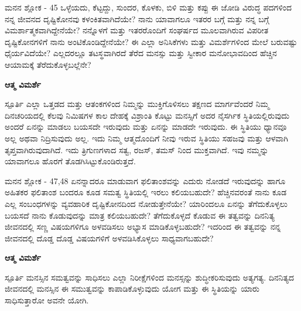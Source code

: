 \begin{mananam}{\mananamfont ಮನನ ಶ್ಲೋಕ - \textenglish{45}}
\footnotesize \mananamtext ಒಳ್ಳೆಯದು, ಕೆಟ್ಟದ್ದು, ಸುಂದರ, ಕೊಳಕು, ಬಿಳಿ ಮತ್ತು ಕಪ್ಪು ಈ ಜೋಡಿ ವಿರುದ್ಧ ಪದಗಳಿಂದ ನನ್ನ ಜೀವನದ ದೃಷ್ಟಿಕೋನವು ಕಳಂಕಿತವಾಗಿದೆಯೇ? ನಾನು ಯಾವಾಗಲೂ ಇತರರ ಬಗ್ಗೆ ಮತ್ತು ನನ್ನ ಬಗ್ಗೆ ವಿಮರ್ಶಾತ್ಮಕವಾಗಿದ್ದೇನೆಯೇ? ನನ್ನೊಳಗೆ ಮತ್ತು ಇತರರೊಂದಿಗೆ ಸಂಘರ್ಷದ ಮೂಲವಾಗಿರುವ ವಿಪರೀತ ದೃಷ್ಟಿಕೋನಗಳಿಗೆ ನಾನು ಅಂಟಿಕೊಂಡಿದ್ದೇನೆಯೇ? ಈ ಎಲ್ಲಾ ಅನಿಸಿಕೆಗಳು ಮತ್ತು ವಿಮರ್ಶೆಗಳಿಂದ ಮೇಲೆ ಬರುವಷ್ಟು ಧೈರ್ಯವಿದೆಯೇ? ಎಲ್ಲದರಲ್ಲೂ ತಟಸ್ಥವಾಗಿರದೆ ತೆರೆದ ಮನಸ್ಸು ಮತ್ತು ಸ್ವೀಕಾರ ಮನೋಭಾವದಿಂದ ಹೆಚ್ಚಿನ ಆಯಾಮಕ್ಕೆ ತೆರೆದುಕೊಳ್ಳಬಲ್ಲೆನೇ?
\end{mananam}
\WritingHand\enspace\textbf{ಆತ್ಮ ವಿಮರ್ಶೆ}
\begin{inspiration}{\mananamfont ಸ್ಪೂರ್ತಿ}
\footnotesize \mananamtext ಎಲ್ಲಾ ಒತ್ತಡದ ಮತ್ತು ಆತಂಕಗಳಿಂದ ನಿಮ್ಮನ್ನು ಮುಕ್ತಿಗೊಳಿಸಲು ತಕ್ಷಣದ ಮಾರ್ಗವೆಂದರೆ ನಿಮ್ಮ ದಿನಚರಿಯದಲ್ಲಿ ಕೆಲವು ನಿಮಿಷಗಳ ಕಾಲ ದೇಹಕ್ಕೆ ವಿಶ್ರಾಂತಿ ಕೊಟ್ಟು ಮನಸ್ಸಿಗೆ ಅದರ ನೈಸರ್ಗಿಕ ಸ್ಥಿತಿಯಲ್ಲಿರುವುದು ಅಂದರೆ ಏನನ್ನು ಮಾಡಲು ಬಯಸದೇ ಇರುವುದು ಮತ್ತು ಏನನ್ನು ಮಾಡದೇ ಇರುವುದು. ಈ ಸ್ಥಿತಿಯು ಧ್ಯಾನವೂ ಅಲ್ಲ ಅಥವಾ ನಿದ್ರಿಸುವುದು ಅಲ್ಲ. ಇದು ನಿಮ್ಮ ಆತ್ಮದೊಂದಿಗೆ ನೀವು ಇರುವ ಸ್ಥಿತಿಯು ಸಹಜವು ಮತ್ತು ಆಳವಾಗಿ ತೃಪ್ತವಾಗಿರುವುದಾಗಿದೆ. ಇದು ತ್ರಿಗುಣಗಳಾದ ಸತ್ವ, ರಜಸ್, ತಮಸ್ ನಿಂದ ಮುಕ್ತವಾಗಿದೆ. ಇವು ನಮ್ಮನ್ನು ಯಾವಾಗಲೂ ಹೊರಗೆ ತೊಡಗಿಸಿಟ್ಟುಕೊಂಡಿರುತ್ತದೆ.
\end{inspiration}
\newpage

\newpage
\begin{mananam}{\mananamfont ಮನನ ಶ್ಲೋಕ - \textenglish{47,48}}
\footnotesize \mananamtext ಏನನ್ನಾದರೂ ಮಾಡುವಾಗ ಫಲಿತಾಂಶವನ್ನು ಎದುರು ನೋಡದೆ ಇರುವುದನ್ನು ಹಾಗೂ ಅಹಿತಕರ ಫಲಿತಾಂಶ ಬಂದರೂ ಕೂಡ ಸಮತ್ವ ಸ್ಥಿತಿಯಲ್ಲಿ ಇರಲು ಕಲಿಯಬಹುದೇ? ಹೆಚ್ಚಿನವರಂತೆ ನಾನು ಕೂಡ ಎಲ್ಲ ಸಂಬಂಧಗಳನ್ನು ವ್ಯವಹಾರಿಕ ದೃಷ್ಟಿಕೋನದಿಂದ ನೋಡುತ್ತೇನೆಯೇ? ಯಾರಿಂದಲೂ ಏನನ್ನು ತೆಗೆದುಕೊಳ್ಳಲು ಬಯಸದೆ ನಾನು ಕೊಡುವುದನ್ನು ಮಾತ್ರ ಕಲಿಯಬಹುದೇ? ತೆಗೆದುಕೊಳ್ಳದೆ ಕೊಡುವ ಈ ತತ್ವವನ್ನು ದಿನನಿತ್ಯ ಜೀವನದಲ್ಲಿ ಸಣ್ಣ ವಿಷಯಗಳಿಗೂ ಅಳವಡಿಸಲು ಅಭ್ಯಾಸ ಮಾಡಿಕೊಳ್ಳಬಹುದೇ? ಇದರಿಂದ ಈ ತತ್ವವನ್ನು ನನ್ನ ಜೀವನದಲ್ಲಿ ದೊಡ್ಡ ದೊಡ್ಡ ವಿಷಯಗಳಿಗೆ ಅಳವಡಿಸಿಕೊಳ್ಳಲು ಸಾಧ್ಯವಾಗಬಹುದೇ?
\end{mananam}
\WritingHand\enspace\textbf{ಆತ್ಮ ವಿಮರ್ಶೆ}
\begin{inspiration}{\mananamfont ಸ್ಪೂರ್ತಿ}
\footnotesize \mananamtext ಮನಸ್ಸಿನ ಸಮತ್ವವನ್ನು ಸಾಧಿಸಲು ಎಲ್ಲಾ ನಿರೀಕ್ಷೆಗಳಿಂದ ಮನಸ್ಸನ್ನು ಶುದ್ಧೀಕರಿಸುವುದು ಅತ್ಯಗತ್ಯ. ದಿನನಿತ್ಯದ ಜೀವನದಲ್ಲಿ ಮನಸ್ಸಿನ ಈ ಸಮುತ್ವವನ್ನು ಕಾಪಾಡಿಕೊಳ್ಳುವುದು ಯೋಗ ಮತ್ತು ಈ ಸ್ಥಿತಿಯನ್ನು ಯಾರು ಸಾಧಿಸುತ್ತಾರೋ ಅವನೇ ಯೋಗಿ.
\end{inspiration}
\newpage

